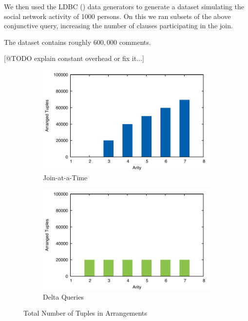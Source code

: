 \documentclass[../catalog.tex]{subfiles}
\begin{document}
We then used the LDBC (\cite{erling2015ldbc}) data generators to
generate a dataset simulating the social network activity of 1000
persons. On this we ran subsets of the above conjunctive query,
increasing the number of clauses participating in the join.

The dataset contains roughly $600,000$ comments.

[@TODO explain constant overhead or fix it...]

\begin{figure}[h!]
  \begin{subfigure}{1.0\textwidth}
    \includegraphics[width=1.0\linewidth]{results/join-state/out/tuples_join}
    \caption{Join-at-a-Time}
  \end{subfigure}
  \begin{subfigure}{1.0\textwidth}
    \includegraphics[width=1.0\linewidth]{results/join-state/out/tuples_delta}
    \caption{Delta Queries}
  \end{subfigure}

  \caption{Total Number of Tuples in Arrangements}
  \label{fig:tuple-counts}
\end{figure}
\end{document}
